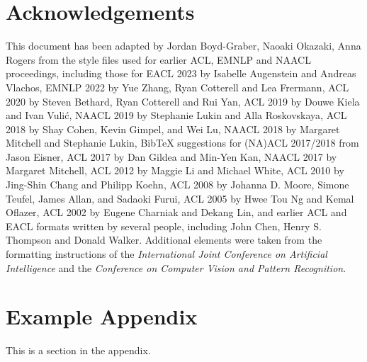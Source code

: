 \documentclass[11pt]{article}
\begin{document}
\section*{Acknowledgements}
This document has been adapted by Jordan Boyd-Graber, Naoaki Okazaki, Anna Rogers from the style files used for earlier ACL, EMNLP and NAACL proceedings, including those for
EACL 2023 by Isabelle Augenstein and Andreas Vlachos,
EMNLP 2022 by Yue Zhang, Ryan Cotterell and Lea Frermann,
ACL 2020 by Steven Bethard, Ryan Cotterell and Rui Yan,
ACL 2019 by Douwe Kiela and Ivan Vuli\'{c},
NAACL 2019 by Stephanie Lukin and Alla Roskovskaya, 
ACL 2018 by Shay Cohen, Kevin Gimpel, and Wei Lu, 
NAACL 2018 by Margaret Mitchell and Stephanie Lukin,
Bib\TeX{} suggestions for (NA)ACL 2017/2018 from Jason Eisner,
ACL 2017 by Dan Gildea and Min-Yen Kan, NAACL 2017 by Margaret Mitchell, 
ACL 2012 by Maggie Li and Michael White, 
ACL 2010 by Jing-Shin Chang and Philipp Koehn, 
ACL 2008 by Johanna D. Moore, Simone Teufel, James Allan, and Sadaoki Furui, 
ACL 2005 by Hwee Tou Ng and Kemal Oflazer, 
ACL 2002 by Eugene Charniak and Dekang Lin, 
and earlier ACL and EACL formats written by several people, including
John Chen, Henry S. Thompson and Donald Walker.
Additional elements were taken from the formatting instructions of the \emph{International Joint Conference on Artificial Intelligence} and the \emph{Conference on Computer Vision and Pattern Recognition}.

% 



\appendix

\section{Example Appendix}
\label{sec:appendix}

This is a section in the appendix.
\end{document}
